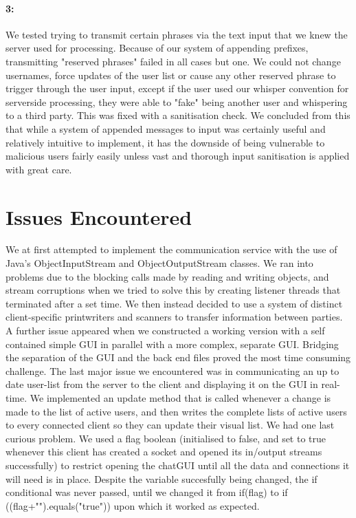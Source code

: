 \documentclass[12pt, a4paper]{article}
\begin{document}
\paragraph{3:}
We tested trying to transmit certain phrases via the text input that we knew the server used for processing. Because of our system of appending prefixes, transmitting "reserved phrases" failed in all cases but one. We could not change usernames, force updates of the user list or cause any other reserved phrase to trigger through the user input, except if the user used our whisper convention for serverside processing, they were able to "fake" being another user and whispering to a third party. This was fixed with a sanitisation check. We concluded from this that while a system of appended messages to input was certainly useful and relatively intuitive to implement, it has the downside of being vulnerable to malicious users fairly easily unless vast and thorough input sanitisation is applied with great care.

\section{Issues Encountered}
We at first attempted to implement the communication service with the use of Java's ObjectInputStream and ObjectOutputStream classes. We ran into problems due to the blocking calls made by reading and writing objects, and stream corruptions when we tried to solve this by creating listener threads that terminated after a set time.
We then instead decided to use a system of distinct client-specific printwriters and scanners to transfer information between parties.
A further issue appeared when we constructed a working version with a self contained simple GUI in parallel with a more complex, separate GUI. Bridging the separation of the GUI and the back end files proved the most time consuming challenge.
The last major issue we encountered was in communicating an up to date user-list from the server to the client and displaying it on the GUI in real-time. We implemented an update method that is called whenever a change is made to the list of active users, and then writes the complete lists of active users to every connected client so they can update their visual list.
We had one last curious problem. We used a flag boolean (initialised to false, and set to true whenever this client has created a socket and opened its in/output streams successfully) to restrict opening the chatGUI until all the data and connections it will need is in place. Despite the variable succesfully being changed, the if conditional was never passed, until we changed it from if(flag) to if ((flag+"").equals("true")) upon which it worked as expected.
\end{document}
